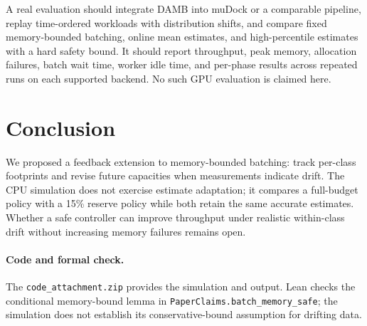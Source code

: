 \documentclass[11pt]{article}
\begin{document}
A real evaluation should integrate DAMB into muDock or a comparable pipeline, replay time-ordered workloads with distribution shifts, and compare fixed memory-bounded batching, online mean estimates, and high-percentile estimates with a hard safety bound. It should report throughput, peak memory, allocation failures, batch wait time, worker idle time, and per-phase results across repeated runs on each supported backend. No such GPU evaluation is claimed here.

\section{Conclusion}
We proposed a feedback extension to memory-bounded batching: track per-class footprints and revise future capacities when measurements indicate drift. The CPU simulation does not exercise estimate adaptation; it compares a full-budget policy with a 15\% reserve policy while both retain the same accurate estimates. Whether a safe controller can improve throughput under realistic within-class drift without increasing memory failures remains open.

\paragraph{Code and formal check.} The \texttt{code\_attachment.zip} provides the simulation and output. Lean checks the conditional memory-bound lemma in \texttt{PaperClaims.batch\_memory\_safe}; the simulation does not establish its conservative-bound assumption for drifting data.


\end{document}
